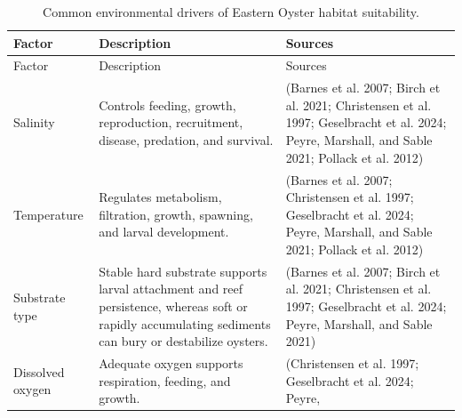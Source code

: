 \documentclass[
  letterpaper,
  DIV=11,
  numbers=noendperiod]{scrartcl}
\begin{document}
\begin{landscape}

\begin{longtable}[]{@{}
  >{\raggedright\arraybackslash}p{}
  >{\raggedright\arraybackslash}p{}
  >{\raggedright\arraybackslash}p{}@{}}
\caption{Common environmental drivers of Eastern Oyster habitat
suitability.}\tabularnewline
\toprule\noalign{}
\begin{minipage}[b]{\linewidth}\raggedright
Factor
\end{minipage} & \begin{minipage}[b]{\linewidth}\raggedright
Description
\end{minipage} & \begin{minipage}[b]{\linewidth}\raggedright
Sources
\end{minipage} \\
\midrule\noalign{}
\endfirsthead
\toprule\noalign{}
\begin{minipage}[b]{\linewidth}\raggedright
Factor
\end{minipage} & \begin{minipage}[b]{\linewidth}\raggedright
Description
\end{minipage} & \begin{minipage}[b]{\linewidth}\raggedright
Sources
\end{minipage} \\
\midrule\noalign{}
\endhead
\bottomrule\noalign{}
\endlastfoot
Salinity & Controls feeding, growth, reproduction, recruitment, disease,
predation, and survival. & (Barnes et al. 2007; Birch et al. 2021;
Christensen et al. 1997; Geselbracht et al. 2024; Peyre, Marshall, and
Sable 2021; Pollack et al. 2012) \\
Temperature & Regulates metabolism, filtration, growth, spawning, and
larval development. & (Barnes et al. 2007; Christensen et al. 1997;
Geselbracht et al. 2024; Peyre, Marshall, and Sable 2021; Pollack et al.
2012) \\
Substrate type & Stable hard substrate supports larval attachment and
reef persistence, whereas soft or rapidly accumulating sediments can
bury or destabilize oysters. & (Barnes et al. 2007; Birch et al. 2021;
Christensen et al. 1997; Geselbracht et al. 2024; Peyre, Marshall, and
Sable 2021) \\
Dissolved oxygen & Adequate oxygen supports respiration, feeding, and
growth. & (Christensen et al. 1997; Geselbracht et al. 2024; Peyre,

\end{longtable}
\end{landscape}
\end{document}
